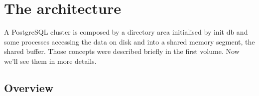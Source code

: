 \chapter{The architecture}
A PostgreSQL cluster is composed by a directory area initialised by init db and some processes 
accessing the data on disk and into a shared memory segment, the shared buffer. Those concepts were 
described briefly in the first volume. Now we'll see them in more details.

\section{Overview}


